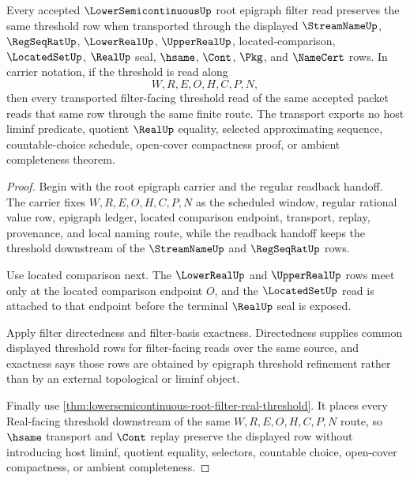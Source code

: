 \begin{theorem}
\label{thm:lowersemicontinuous-root-epigraph-threshold-continuity}
Every accepted $\LowerSemicontinuousUp$ root epigraph filter read preserves the same threshold row when transported through the displayed $\StreamNameUp$, $\RegSeqRatUp$, $\LowerRealUp$, $\UpperRealUp$, located-comparison, $\LocatedSetUp$, $\RealUp$ seal, $\hsame$, $\Cont$, $\Pkg$, and $\NameCert$ rows. In carrier notation, if the threshold is read along
$$
W,R,E,O,H,C,P,N ,
$$
then every transported filter-facing threshold read of the same accepted packet reads that same row through the same finite route. The transport exports no host liminf predicate, quotient $\RealUp$ equality, selected approximating sequence, countable-choice schedule, open-cover compactness proof, or ambient completeness theorem.
\end{theorem}
\begin{proof}
Begin with the root epigraph carrier and the regular readback handoff. The carrier fixes $W,R,E,O,H,C,P,N$ as the scheduled window, regular rational value row, epigraph ledger, located comparison endpoint, transport, replay, provenance, and local naming route, while the readback handoff keeps the threshold downstream of the $\StreamNameUp$ and $\RegSeqRatUp$ rows.

Use located comparison next. The $\LowerRealUp$ and $\UpperRealUp$ rows meet only at the located comparison endpoint $O$, and the $\LocatedSetUp$ read is attached to that endpoint before the terminal $\RealUp$ seal is exposed.

Apply filter directedness and filter-basis exactness. Directedness supplies common displayed threshold rows for filter-facing reads over the same source, and exactness says those rows are obtained by epigraph threshold refinement rather than by an external topological or liminf object.

Finally use \autoref{thm:lowersemicontinuous-root-filter-real-threshold}. It places every Real-facing threshold downstream of the same $W,R,E,O,H,C,P,N$ route, so $\hsame$ transport and $\Cont$ replay preserve the displayed row without introducing host liminf, quotient equality, selectors, countable choice, open-cover compactness, or ambient completeness.
\end{proof}

